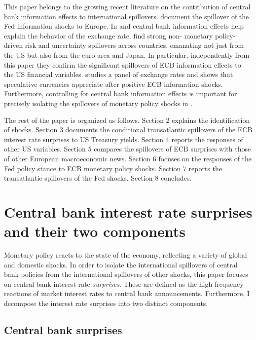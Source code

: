 \documentclass[a4paper,12pt]{article}
\begin{document}
This paper belongs to the growing recent literature on the contribution of central bank information effects to international spillovers. 
\cite{CesaBianchi_Sokol_2022} document the spillover of the Fed information shocks to Europe.
In \cite{Stavrakeva_Tang_2021} and \cite{Gurkaynak_etal_2021} central bank information effects help explain the behavior of the exchange rate. \cite{Bekaert_Hoerova_Xu_2020} find strong non-
monetary policy-driven risk and uncertainty spillovers across countries, emanating not just from the US but also from the euro area and Japan. In particular, independently from this paper they confirm the significant spillovers of ECB information effects to the US financial variables. 
\cite{Franz_2020} studies a panel of exchange rates and shows that speculative currencies appreciate after positive ECB information shocks. Furthermore, controlling for central bank information effects is important for precisely isolating the spillovers of monetary policy shocks in \cite{Cazorzi_etal_2020,MirandaAgrippino_Rey_2020,Corsetti_etal_2021,MirandaAgrippino_Nenova_2021}.

The rest of the paper is organized as follows. Section 2 explains the identification of shocks.
Section 3 documents the conditional transatlantic spillovers of the ECB interest rate surprises to US Treasury yields.
Section 4 reports the responses of other US variables.
Section 5 compares the spillovers of ECB surprises with those of other European macroeconomic news.
Section 6 focuses on the responses of the Fed policy stance to ECB monetary policy shocks.
Section 7 reports the transatlantic spillovers of the Fed shocks.
Section 8 concludes.

\section{Central bank interest rate surprises and their two components}\label{sec: surprises}

Monetary policy reacts to the state of the economy, reflecting a variety of global and
domestic shocks. In order to isolate the international spillovers of central bank policies
from the international spillovers of other shocks, this paper focuses on central bank interest rate \emph{surprises}. 
These are defined as the high-frequency reactions of market interest rates to central bank announcements.
Furthermore, I decompose the interest rate surprises into two distinct components.

\subsection{Central bank surprises}
\end{document}

